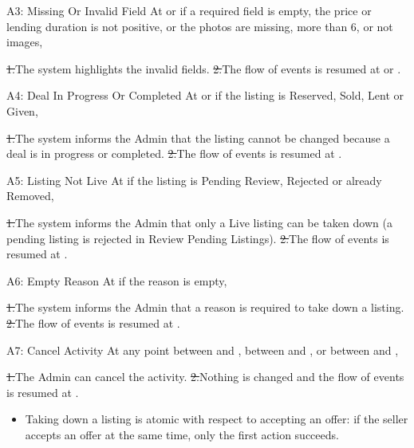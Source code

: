 \begin{flowblock}{A3: Missing Or Invalid Field}
At  or  if a required field is empty, the price or lending duration is not positive, or the photos are missing, more than 6, or not images,\par
\st{1.}{The system highlights the invalid fields.}
\st{2.}{The flow of events is resumed at  or .}
\end{flowblock}
\begin{flowblock}{A4: Deal In Progress Or Completed}
At  or  if the listing is Reserved, Sold, Lent or Given,\par
\st{1.}{The system informs the Admin that the listing cannot be changed because a deal is in progress or completed.}
\st{2.}{The flow of events is resumed at .}
\end{flowblock}
\begin{flowblock}{A5: Listing Not Live}
At  if the listing is Pending Review, Rejected or already Removed,\par
\st{1.}{The system informs the Admin that only a Live listing can be taken down (a pending listing is rejected in Review Pending Listings).}
\st{2.}{The flow of events is resumed at .}
\end{flowblock}
\begin{flowblock}{A6: Empty Reason}
At  if the reason is empty,\par
\st{1.}{The system informs the Admin that a reason is required to take down a listing.}
\st{2.}{The flow of events is resumed at .}
\end{flowblock}
\begin{flowblock}{A7: Cancel Activity}
At any point between  and , between  and , or between  and ,\par
\st{1.}{The Admin can cancel the activity.}
\st{2.}{Nothing is changed and the flow of events is resumed at .}
\end{flowblock}
\begin{itemize}
  \item Taking down a listing is atomic with respect to accepting an offer: if the seller accepts an offer at the same time, only the first action succeeds.
\end{itemize}

